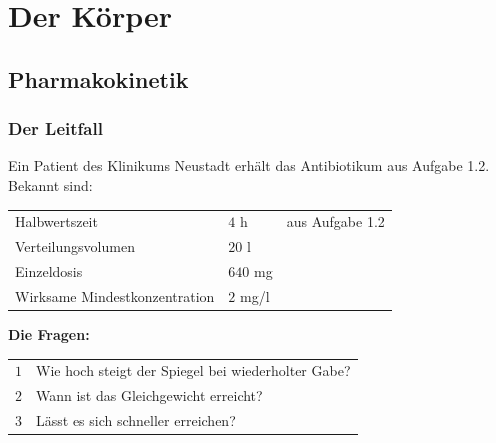 \part{Der Körper}

\chapter{Pharmakokinetik}

\section{Der Leitfall}

\begin{merksatz}
Ein Patient des Klinikums Neustadt erhält das Antibiotikum aus Aufgabe 1.2. Bekannt sind:

\begin{center}
\renewcommand{\arraystretch}{1.48}
\begin{tabular}{@{}P{3.0cm}P{1.6cm}P{3.4cm}@{}}
\toprule
Halbwertszeit & $4$ h & aus Aufgabe 1.2\\
Verteilungs\-volumen & $20$ l & \\
Einzeldosis & $640$ mg & \\
Wirksame Mindest\-konzentration & $2$ mg/l & \\
\bottomrule
\end{tabular}
\end{center}

\textbf{Die Fragen:}
\begin{center}
\renewcommand{\arraystretch}{1.45}
\begin{tabular}{@{}P{1.0cm}P{7.4cm}@{}}
\toprule
$1$ & Wie hoch steigt der Spiegel bei wiederholter Gabe?\\
$2$ & Wann ist das Gleichgewicht erreicht?\\
$3$ & Lässt es sich schneller erreichen?\\
\bottomrule
\end{tabular}
\end{center}
\end{merksatz}

